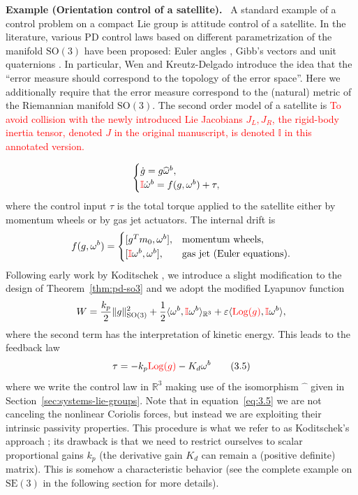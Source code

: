 \documentclass[11pt]{article}
\newcommand{\rev}[1]{\textcolor{red}{#1}}
\newcommand{\Log}{\operatorname{Log}}
\newcommand{\SO}{\mathrm{SO}}
\newcommand{\SE}{\mathrm{SE}}
\newcommand{\R}{\mathbb R}
\newcommand{\eps}{\varepsilon}
\newcounter{paperexample}
\renewcommand{\thepaperexample}{\arabic{paperexample}}
\newcommand{\paperexample}[2]{\refstepcounter{paperexample}\par\medskip\noindent\textbf{Example \thepaperexample#1.}\label{#2}\ }
\begin{document}
\paperexample{ (Orientation control of a satellite)}{ex:satellite-orientation} A standard example of a control problem on a compact Lie group is attitude control of a satellite. In the literature, various PD control laws based on different parametrization of the manifold $\SO(3)$ have been proposed: Euler angles \cite{30}, Gibb's vectors \cite{31} and unit quaternions \cite{34}. In particular, Wen and Kreutz-Delgado \cite{34} introduce the idea that the ``error measure should correspond to the topology of the error space''. Here we additionally require that the error measure correspond to the (natural) metric of the Riemannian manifold $\SO(3)$. The second order model of a satellite is
\rev{To avoid collision with the newly introduced Lie Jacobians $J_L,J_R$, the rigid-body inertia tensor, denoted $J$ in the original manuscript, is denoted $\mathbb I$ in this annotated version.}\par
\begin{equation*}
\begin{cases}
\dot g=g\widehat\omega^b,\\
\rev{\mathbb I}\dot\omega^b=f(g,\omega^b)+\tau,
\end{cases}
\end{equation*}
where the control input $\tau$ is the total torque applied to the satellite either by momentum wheels or by gas jet actuators. The internal drift is
\begin{equation*}
f(g,\omega^b)=
\begin{cases}
[g^T m_0,\omega^b],&\text{momentum wheels},\\
[\rev{\mathbb I}\omega^b,\omega^b],&\text{gas jet (Euler equations)}.
\end{cases}
\end{equation*}
Following early work by Koditschek \cite{19}, we introduce a slight modification to the design of Theorem~\ref{thm:pd-so3} and we adopt the modified Lyapunov function
\begin{equation*}
W=\frac{k_p}{2}\|g\|_{\SO(3)}^2+\frac12\langle\omega^b,\rev{\mathbb I}\omega^b\rangle_{\R^3}+\eps\langle\rev{\Log(g)},\rev{\mathbb I}\omega^b\rangle,
\end{equation*}
where the second term has the interpretation of kinetic energy. This leads to the feedback law
\begin{equation*}
\tau=-k_p\rev{\Log(g)}-K_d\omega^b\tag{3.5}\label{eq:3.5}
\end{equation*}
where we write the control law in $\R^3$ making use of the isomorphism $\widehat{\phantom{x}}$ given in Section~\ref{sec:systems-lie-groups}.
Note that in equation~\eqref{eq:3.5} we are not canceling the nonlinear Coriolis forces, but instead we are exploiting their intrinsic passivity properties. This procedure is what we refer to as Koditschek's approach \cite{19}; its drawback is that we need to restrict ourselves to scalar proportional gains $k_p$ (the derivative gain $K_d$ can remain a (positive definite) matrix). This is somehow a characteristic behavior (see the complete example on $\SE(3)$ in the following section for more details).
\end{document}
